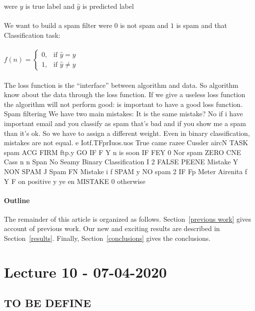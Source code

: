 \documentclass[12pt]{article}
\begin{document}
were $y $ is true label and $\hat{y}$ is predicted label
\\\\
We want to build a spam filter were $0$ is not spam and $1$ is spam and that 
Classification task: 
\\\\
$f(n) = \begin{cases} 0, & \mbox{if } \hat{y} = y 
\\ 1, & 
\mbox{if }\hat{y} \neq y
\end{cases}
$
\\\\
The loss function is the “interface” between algorithm and data.
So algorithm know about the data through the loss function.
If we give a useless loss function the algorithm will not perform good: is
important to have a good loss function.
Spam filtering
We have two main mistakes:
It is the same mistake? No if i have important email and you classify as spam
that’s bad and if you show me a spam than it’s ok.
So we have to assign a different weight.
Even in binary classification, mistakes are not equal.
e Iotf.TFprIuos.uos
True came
razee
Cussler aircN TASK spam ACG FIRM
ftp.y GO
IF F Y n is soon
IF FEY 0 Nor spam
ZERO CNE Cass
n n
Span No Seamy Binary Classification
I 2
FALSE PEENE Mistake Y NON SPAM J Spam
FN Mistake i f SPAM y NO spam
2 IF Fp Meter Airenita
f Y F on positive
y ye en MISTAKE
0 otherwise


\paragraph{Outline}
The remainder of this article is organized as follows.
Section~\ref{previous work} gives account of previous work.
Our new and exciting results are described in Section~\ref{results}.
Finally, Section~\ref{conclusions} gives the conclusions.


\section{Lecture 10 - 07-04-2020}

\subsection{TO BE DEFINE}
\end{document}
